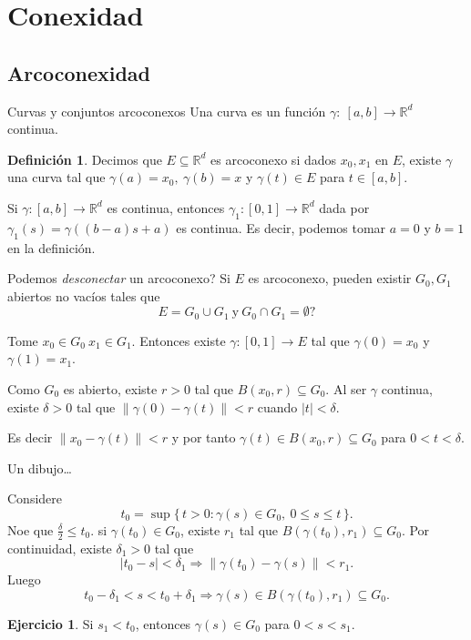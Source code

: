 \documentclass[utf8]{beamer}
\theoremstyle{plain}
\theoremstyle{definition}
\newtheorem{Def}{Definición}           %
\newtheorem{Ej}{Ejercicio}             %
\theoremstyle{remark}
\numberwithin{equation}{section}
\newcommand{\dl}{\delta}                %
\newcommand{\ga}{\gamma}                %
\newcommand{\bR}{\mathbb{R}}    %
\newcommand{\nm}[1]{\left\|#1\right\|} %
\newcommand{\set}[1]{\{\,#1\,\}}    %
\renewcommand{\leq}{\leqslant}          %
\newcommand{\To}{\Rightarrow}
\begin{document}
\section{Conexidad}

\subsection{Arcoconexidad}

\begin{frame}{Curvas y conjuntos arcoconexos}
    Una \alert{curva} es un funci\'on $\ga:\ [a,b]\to\bR^d$ continua.
    \begin{Def}
        Decimos que $E\subseteq\bR^d$ es arcoconexo si dados $x_0, x_1$ en $E$, existe $\ga$ una curva tal que $\ga(a)=x_0,\ \ga(b)=x$
        y $\ga(t)\in E$ para $t\in[a,b]$.
    \end{Def}        
    
    Si $\ga:[a,b]\to\bR^d$ es continua, entonces $\ga_1:[0,1]\to\bR^d$ dada por $\ga_1(s)=\ga((b-a)s+a)$ es continua. Es decir, podemos tomar $a=0$ y $b=1$ en la definición.
\end{frame}

\begin{frame}{Podemos \emph{desconectar} un arcoconexo?}
    Si $E$ es arcoconexo, pueden existir $G_0,G_1$ abiertos no vac\'ios tales que 
    $$E=G_0\cup G_1\ \text{y}\ G_0\cap G_1=\emptyset?$$\par 
    Tome $x_0\in G_0\ x_1\in G_1$. Entonces existe $\ga: [0,1]\to E$ tal que $\ga(0)=x_0$ y $\ga(1)=x_1$. \par Como $G_0$ es abierto, existe $r>0$ tal que $B(x_0,r)\subseteq G_0$. Al ser $\ga$ continua, existe $\dl>0$ tal que $\nm{\ga(0)-\ga(t)}<r$ cuando $|t|<\dl$.\par  Es decir $\nm{x_0-\ga(t)}<r$ y por tanto $\ga(t)\in B(x_0,r)\subseteq G_0$ para $0<t<\dl$.
\end{frame}

\begin{frame}{Un dibujo\dots}
    
\end{frame}

\begin{frame}
    Considere 
    $$t_0=\sup\set{t>0: \ga(s)\in G_0,\ 0\leq s\leq t}.$$
    Noe que $\frac\dl 2\leq t_0$. si $\ga(t_0)\in G_0$, existe $r_1$ tal que $B(\ga(t_0),r_1)\subseteq G_0$. Por continuidad, existe $\dl_1>0$ tal que 
    $$|t_0-s|<\dl_1\To \nm{\ga(t_0)-\ga(s)}<r_1.$$
    Luego 
    $$t_0-\dl_1<s<t_0+\dl_1\To \ga(s)\in B(\ga(t_0),r_1)\subseteq G_0.$$
    \begin{Ej}
        Si $s_1<t_0$, entonces $\ga(s)\in G_0$ para $0<s<s_1$.
    \end{Ej}
\end{frame}
\end{document}
